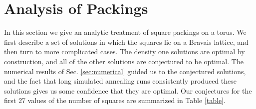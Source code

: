 \section{Analysis of Packings}
\label{sec:analytics}

In this section we give an analytic treatment of square packings on a torus.  We first describe a set of solutions in which the squares lie on a Bravais lattice, and then turn to more complicated cases. The density one solutions are optimal by construction, and all of the other solutions are conjectured to be optimal. The numerical results of Sec. \ref{sec:numerical} guided us to the conjectured solutions, and the fact that long simulated annealing runs consistently produced these solutions gives us some confidence that they are optimal.  Our conjectures for the first 27 values of the number of squares are summarized in Table \ref{table}.

